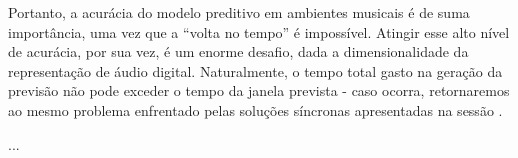 Portanto, a acurácia do modelo preditivo em ambientes musicais é de suma importância, uma vez que a ``volta no tempo'' é impossível. Atingir esse alto nível de acurácia, por sua vez, é um enorme desafio, dada a dimensionalidade da representação de áudio digital. Naturalmente, o tempo total gasto na geração da previsão não pode exceder o tempo da janela prevista - caso ocorra, retornaremos ao mesmo problema enfrentado pelas soluções síncronas apresentadas na sessão .

...
